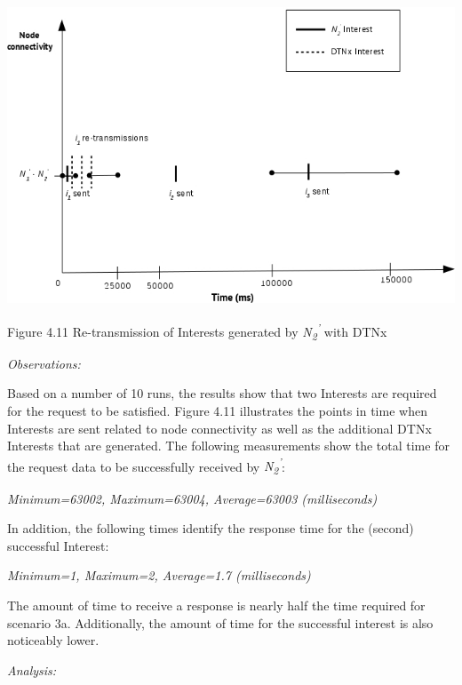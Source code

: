 \documentclass[a4paper,12pt]{report}      %
\begin{document}
\noindent\includegraphics[scale=0.55]{exp3b_timediag.jpg}\newline
\begin{center}Figure 4.11 Re-transmission of Interests generated by \emph{N\textsubscript{2}\textsuperscript{'}} with DTNx\end{center} 

\vspace*{1\baselineskip}\noindent\emph{Observations:}

Based on a number of 10 runs, the results show that two Interests are required for the request to be
satisfied. Figure 4.11 illustrates the points in time when Interests are sent related to node connectivity as well as 
the additional DTNx Interests that are generated. The following measurements show the total time for the request data to be successfully received by \emph{N\textsubscript{2}\textsuperscript{'}}:

\begin{center}\textsl{Minimum=63002, Maximum=63004, Average=63003 (milliseconds)}\end{center}

In addition, the following times identify the response time for the (second) successful Interest:

\begin{center}\textsl{Minimum=1, Maximum=2, Average=1.7 (milliseconds)}\end{center}

The amount of time to receive a response is nearly half the time required for scenario 3a. Additionally, the amount of time for the 
successful interest is also noticeably lower.

\vspace*{1\baselineskip}\noindent\emph{Analysis:}
\end{document}
